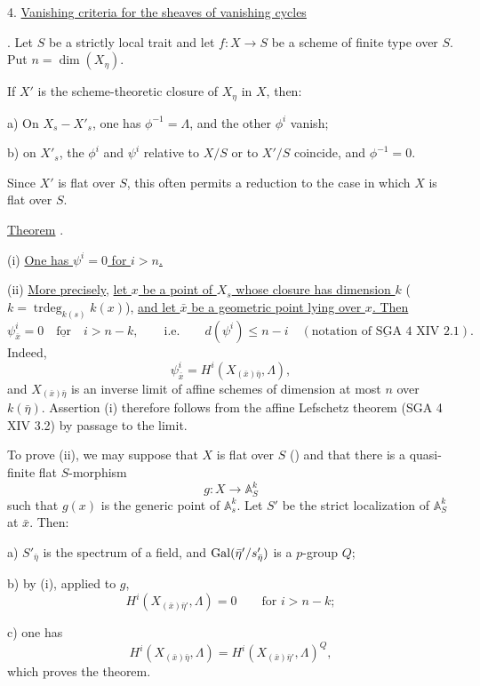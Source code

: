 
4. \underline{Vanishing criteria for the sheaves of vanishing cycles}

. Let $S$ be a strictly local trait and let
$f:X\longrightarrow S$ be a scheme of finite type over $S$. Put
$n=\dim(X_\eta)$.

If $X'$ is the scheme-theoretic closure of $X_\eta$ in $X$, then:

a) On $X_s-X'_s$, one has $\phi^{-1}=\Lambda$, and the other
$\phi^i$ vanish;


b) on $X'_s$, the $\phi^i$ and $\psi^i$ relative to $X/S$ or to
$X'/S$ coincide, and $\phi^{-1}=0$.

Since $X'$ is flat over $S$, this often permits a reduction to the case
in which $X$ is flat over $S$.

\underline{Theorem} .

(i) \underline{One has $\psi^i=0$ for $i>n$.}

(ii) \underline{More precisely}, \underline{let $x$ be a point of $X_s$ whose
closure has dimension $k$}
($k=\operatorname{trdeg}_{k(s)}k(x)$),
\underline{and let $\bar x$ be a geometric point lying over $x$. Then}
\begin{equation*}
\psi^i_{\bar x}=0
\quad\underline{\text{for}}\quad i>n-k,
\qquad\text{i.e.}\qquad
d(\psi^i)\leqslant n-i
\quad(\underline{\text{notation of SGA 4 XIV 2.1}}).
\end{equation*}
Indeed,
\[
\psi^i_{\bar x}=H^i(X_{(\bar x)\bar\eta},\Lambda),
\]
and $X_{(\bar x)\bar\eta}$ is an inverse limit of affine schemes of
dimension at most $n$ over $k(\bar\eta)$. Assertion (i) therefore follows
from the affine Lefschetz theorem (SGA 4 XIV 3.2) by passage to the
limit.

To prove (ii), we may suppose that $X$ is flat over $S$ () and that
there is a quasi-finite flat $S$-morphism
\[
g:X\longrightarrow\mathbb A^k_S
\]
such that $g(x)$ is the generic point of $\mathbb A^k_s$. Let $S'$ be
the strict localization of $\mathbb A^k_S$ at $\bar x$. Then:

a) $S'_{\bar\eta}$ is the spectrum of a field, and
$\operatorname{Gal}(\bar\eta'/s'_{\bar\eta})$ is a $p$-group $Q$;

b) by (i), applied to $g$,
\[
H^i(X_{(\bar x)\bar\eta'},\Lambda)=0
\qquad\text{for }i>n-k;
\]

c) one has
\[
H^i(X_{(\bar x)\bar\eta},\Lambda)
=H^i(X_{(\bar x)\bar\eta'},\Lambda)^Q,
\]
which proves the theorem.


